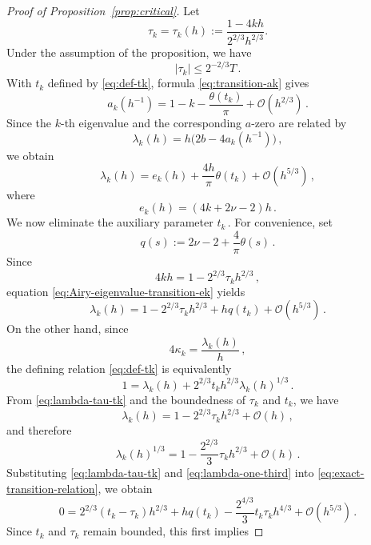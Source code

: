 \documentclass[11pt]{amsart}
\numberwithin{equation}{section}
\theoremstyle{remark}
\begin{document}
\begin{proof}[Proof of Proposition~\ref{prop:critical}]
	Let
	\[
	\tau_k=\tau_k(h)
	:=
	\frac{1-4kh}{2^{2/3}h^{2/3}}.
	\]
	Under the assumption of the proposition, we have
	\[
	|\tau_k|\leq 2^{-2/3}T\,.
	\]
	With $t_k$ defined by \eqref{eq:def-tk}, formula
	\eqref{eq:transition-ak} gives
	\begin{equation}\label{eq:transition-ak-proof}
		a_k(h^{-1})
		=
		1-k-\frac{\theta(t_k)}{\pi}
		+\mathcal O(h^{2/3})\,.
	\end{equation}
	Since the $k$-th eigenvalue and the corresponding $a$-zero are
	related by
	\[
	\lambda_k(h)
	=
	h\bigl(2b-4a_k(h^{-1})\bigr)\,,
	\]
	we obtain
	\begin{equation}\label{eq:Airy-eigenvalue-transition-ek}
		\lambda_k(h)
		=
		e_k(h)
		+
		\frac{4h}{\pi}\theta(t_k)
		+
		\mathcal O(h^{5/3})\,,
	\end{equation}
	where
	\[
	e_k(h)=(4k+2\nu-2)h\,.
	\]
	We now eliminate the auxiliary parameter $t_k\,$. For convenience,
	set
	\begin{equation}\label{eq:def-q-transition}
		q(s):=
		2\nu-2+\frac{4}{\pi}\theta(s)\,.
	\end{equation}
	Since
	\[
	4kh
	=
	1-2^{2/3}\tau_k h^{2/3}\,,
	\]
	equation \eqref{eq:Airy-eigenvalue-transition-ek} yields
	\begin{equation}\label{eq:lambda-tau-tk}
		\lambda_k(h)
		=
		1-2^{2/3}\tau_k h^{2/3}
		+hq(t_k)
		+\mathcal O(h^{5/3})\,.
	\end{equation}
	On the other hand, since
	\[
	4\kappa_k=\frac{\lambda_k(h)}{h}\,,
	\]
	the defining relation \eqref{eq:def-tk} is equivalently 
	\begin{equation}\label{eq:exact-transition-relation}
		1
		=
		\lambda_k(h)
		+
		2^{2/3}t_k h^{2/3}\lambda_k(h)^{1/3}\,.
	\end{equation}
	From \eqref{eq:lambda-tau-tk} and the boundedness of $\tau_k$ and
	$t_k$, we have
	\[
	\lambda_k(h)
	=
	1-2^{2/3}\tau_k h^{2/3}
	+\mathcal O(h)\,,
	\]
	and therefore
	\begin{equation}\label{eq:lambda-one-third}
		\lambda_k(h)^{1/3}
		=
		1-\frac{2^{2/3}}{3}\tau_k h^{2/3}
		+\mathcal O(h)\,.
	\end{equation}
	Substituting \eqref{eq:lambda-tau-tk} and
	\eqref{eq:lambda-one-third} into
	\eqref{eq:exact-transition-relation}, we obtain
	\[
	0
	=
	2^{2/3}(t_k-\tau_k)h^{2/3}
	+
	hq(t_k)
	-
	\frac{2^{4/3}}{3}t_k\tau_k h^{4/3}
	+
	\mathcal O(h^{5/3})\,.
	\]
	Since $t_k$ and $\tau_k$ remain bounded, this first implies

\end{proof}
\end{document}
